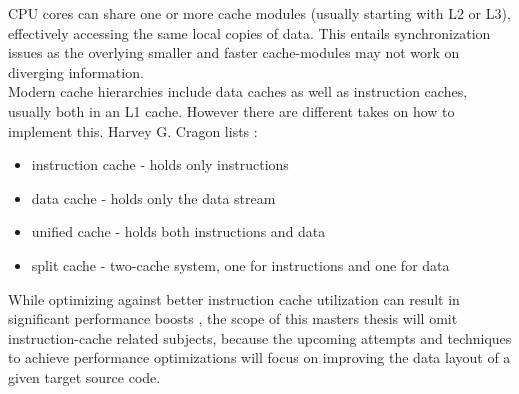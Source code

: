 CPU cores can share one or more cache modules (usually starting with L2 or L3), effectively accessing the same local copies of data. This entails synchronization issues as the overlying smaller and faster cache-modules may not work on diverging information.\\
Modern cache hierarchies include data caches as well as instruction caches, usually both in an L1 cache. However there are different takes on how to implement this. Harvey G. Cragon lists :
\begin{itemize}
	\item instruction cache - holds only instructions
	\item data cache - holds only the data stream
	\item unified cache - holds both instructions and data
	\item split cache - two-cache system, one for instructions and one for data
\end{itemize}
While optimizing against better instruction cache utilization can result in significant performance boosts , the scope of this masters thesis will omit instruction-cache related subjects, because the upcoming attempts and techniques to achieve performance optimizations will focus on improving the data layout of a given target source code.

